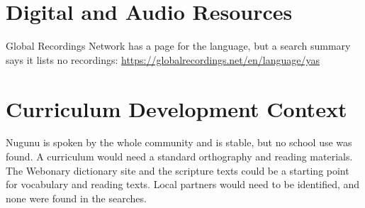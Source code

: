 \documentclass[12pt]{article}
\begin{document}
\section{Digital and Audio Resources}
Global Recordings Network has a page for the language, but a search summary says it lists no recordings: \url{https://globalrecordings.net/en/language/yas}

\section{Curriculum Development Context}
Nugunu is spoken by the whole community and is stable, but no school use was found. A curriculum would need a standard orthography and reading materials. The Webonary dictionary site and the scripture texts could be a starting point for vocabulary and reading texts. Local partners would need to be identified, and none were found in the searches.
\end{document}
